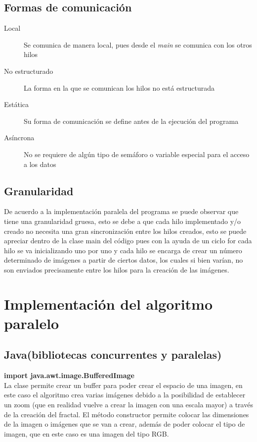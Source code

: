 \documentclass[12pt,a4paper]{article}
\begin{document}
		\subsection{Formas de comunicación}
		\begin{description}
			\item[\faCheckSquareO  Local] Se comunica de manera local, pues desde el \textit{main} se comunica con los otros hilos
			\item[\faCheckSquareO  No estructurado] La forma en la que se comunican los hilos no está estructurada 
			\item[\faCheckSquareO  Estática] Su forma de comunicación se define antes de la ejecución del programa
			\item[\faCheckSquareO  Asíncrona] No se requiere de algún tipo de semáforo o variable especial para el acceso a los datos
		\end{description}
		
		\subsection{Granularidad}
		De acuerdo a la implementación paralela del programa se puede observar que tiene una granularidad gruesa, esto se debe a que cada hilo implementado y/o creado no necesita una gran sincronización entre los hilos creados, esto se puede apreciar dentro de la clase main del código pues con la ayuda de un ciclo for cada hilo se va inicializando uno por uno y cada hilo se encarga de crear un número determinado de imágenes a partir de ciertos datos, los cuales si bien varían, no son enviados precisamente entre los hilos para la creación de las imágenes.
	
	\section{Implementación del algoritmo paralelo}
		\subsection{Java(bibliotecas concurrentes y paralelas)}
			\textbf{import java.awt.image.BufferedImage}\\
			La clase permite crear un buffer para poder crear el espacio de una imagen, en este caso el algoritmo crea varias imágenes debido a la posibilidad de establecer un zoom (que en realidad vuelve a crear la imagen con una escala mayor) a través de la creación del fractal. El método constructor permite colocar las dimensiones de la imagen o imágenes que se van a crear, además de poder colocar el tipo de imagen, que en este caso es una imagen del tipo RGB.
			
\end{document}
